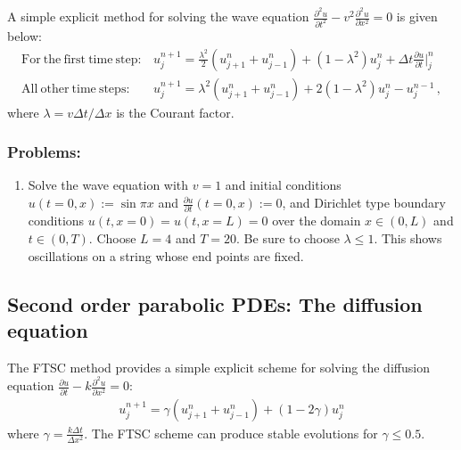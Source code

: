 A simple explicit method for solving the wave equation $\frac{\partial^2 u}{\partial t^2} - v^2 \frac{\partial^2 u}{\partial x^2} = 0$ is given below: 
\begin{eqnarray}
\mathrm{For~the~first~time~step:} & u^{n+1}_j = \frac{\lambda^2}{2} \left( u^n_{j+1} + u^n_{j-1} \right) + \left(1 - \lambda^2 \right) u^n_j + \Delta t \frac{\partial u}{\partial t} \big |^n_j\\ 
\mathrm{All~other~time~steps:} & u^{n+1}_j = \lambda^2 \left( u^n_{j+1} + u^n_{j-1} \right) + 2 \left(1 - \lambda^2 \right) u^n_j - u^{n-1}_j\, , 
\end{eqnarray}
where $\lambda = v\Delta t/\Delta x$ is the Courant factor.

\subsubsection{Problems:}
\begin{enumerate}
\item Solve the wave equation with $v = 1$ and initial conditions $u(t=0,x) := \sin \pi x$ and $\frac{\partial u}{\partial t}(t=0,x) := 0$, and Dirichlet type boundary conditions $u(t,x=0) = u(t,x=L) = 0 $ over the domain $x \in (0,L)$ and $t \in (0,T)$. Choose $L = 4$ and $T = 20$. Be sure to choose $\lambda \leq 1$. This shows oscillations on a string whose end points are fixed.  
\end{enumerate}

\subsection{Second order parabolic PDEs: The diffusion equation}

The FTSC method provides a simple explicit scheme for solving the diffusion equation $\frac{\partial u}{\partial t} - k \frac{\partial^2 u}{\partial x^2} = 0$:
\begin{eqnarray}
u_j^{n+1} = \gamma \left(u^n_{j+1} + u^n_{j-1} \right) + (1 - 2 \gamma) u^n_j
\end{eqnarray}
where $\gamma = \frac{k\Delta t}{\Delta x^2}$. The FTSC scheme can produce stable evolutions for $\gamma \leq 0.5$. 

